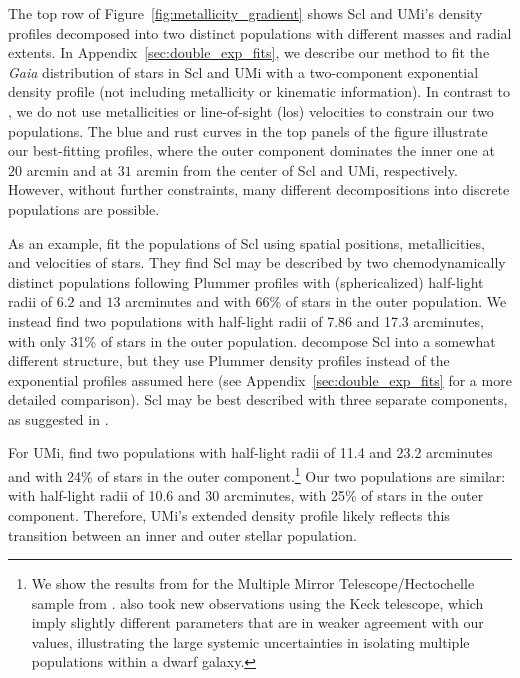 \documentclass[linenumbers, twocolumn, twocolappendix]{aastex701}
\makeatletter
\DeclareRobustCommand\citepos
  {\begingroup
   \let\NAT@nmfmt\NAT@posfmt%
   \NAT@swafalse\let\NAT@ctype\z@\NAT@partrue
   \@ifstar{\NAT@fulltrue\NAT@citetp}{\NAT@fullfalse\NAT@citetp}}
\let\NAT@orig@nmfmt\NAT@nmfmt
\def\NAT@posfmt#1{\NAT@orig@nmfmt{#1's}}
\makeatother
\begin{document}
The top row of Figure~\ref{fig:metallicity_gradient} shows Scl and UMi's density profiles decomposed into two distinct populations with different masses and radial extents. In Appendix~\ref{sec:double_exp_fits}, we describe our method to fit the \textit{Gaia} distribution of stars in Scl and UMi with a two-component exponential density profile (not including metallicity or kinematic information). In contrast to \citet{pace+2020, arroyo-polonio+2024}, we do not use metallicities or line-of-sight (los) velocities to constrain our two populations. The blue and rust curves in the top panels of the figure illustrate our best-fitting profiles, where the outer component dominates the inner one at $20$ arcmin and at $31$ arcmin from the center of Scl and UMi, respectively. 
However, without further constraints, many different decompositions into discrete populations are possible.

As an example, \citet{arroyo-polonio+2024} fit the populations of Scl using spatial positions, metallicities, and velocities of stars. They find Scl may be described by two chemodynamically distinct populations following Plummer profiles with (sphericalized) half-light radii of $6.2$ and $13$ arcminutes and with 66\% of stars in the outer population. We instead find two populations with half-light radii of 7.86 and 17.3 arcminutes, with only 31\% of stars in the outer population.  \citepos{arroyo-polonio+2024} decompose Scl into a somewhat different structure, but they use Plummer density profiles instead of the exponential profiles assumed here (see Appendix~\ref{sec:double_exp_fits} for a more detailed comparison). Scl may be best described with three separate components, as suggested in \citet{arroyo-polonio+2024}.

For UMi, \citet{pace+2020} find two populations with half-light radii of 11.4 and 23.2 arcminutes and with 24\% of stars in the outer component.\footnote{
 We show the results from \citet{pace+2020} for the Multiple Mirror Telescope/Hectochelle sample from \citealt{spencer+2018}. 
 \citet{pace+2020} also took new observations using the Keck telescope, which imply slightly different parameters that are in weaker agreement with our values, illustrating the large systemic uncertainties in isolating multiple populations within a dwarf galaxy.
}
Our two populations are similar: with half-light radii of 10.6 and 30 arcminutes, with 25\% of stars in the outer component. Therefore, UMi's extended density profile likely reflects this transition between an inner and outer stellar population.
\end{document}
